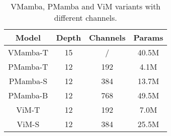 \begin{table}[]
\centering
\begin{tabular}{cccc}
\toprule
Model    & Depth & Channels & Params \\ \midrule
VMamba-T & 15    &  /      & 40.5M   \\
PMamba-T & 12    & 192      & 4.1M   \\
PMamba-S & 12    & 384      & 13.7M  \\
PMamba-B & 12    & 768      & 49.5M  \\ 
ViM-T & 12    & 192      & 7.0M   \\
ViM-S & 12    & 384      & 25.5M  \\

\midrule
\end{tabular}
\caption{
VMamba, PMamba and ViM variants with different channels.
}
\label{tab:variants}
\end{table}